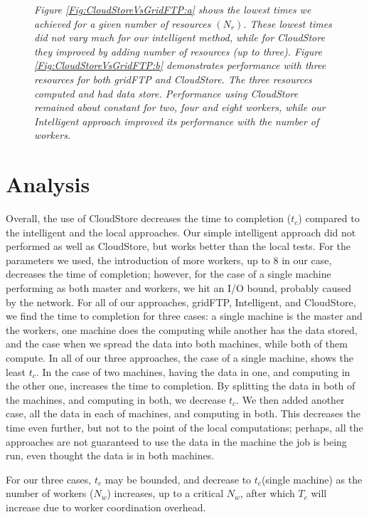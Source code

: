 \documentclass{rspublic}
\begin{document}
\begin{figure}
\begin{center}
{\label{Fig:CloudStoreVsGridFTP:b}
}
\caption{\textit{Figure \ref{Fig:CloudStoreVsGridFTP:a}
 shows the lowest times we achieved for a given number of resources
 $(N_{r})$. These lowest times did not vary much for our intelligent
 method, while for CloudStore they improved by adding number of
 resources (up to three). Figure \ref{Fig:CloudStoreVsGridFTP:b}
 demonstrates performance with three resources for both gridFTP and
 CloudStore. The three resources computed and had data store.
 Performance using CloudStore remained about constant for two, four and
 eight workers, while our Intelligent approach improved its performance
 with the number of workers.}}
\label{Fig:CloudStoreVsGridFTP}
\end{center}
\end{figure}

%

\section{Analysis}

Overall, the use of CloudStore decreases the time to completion
($t_c$) compared to the intelligent and the local approaches. Our
simple intelligent approach did not performed as well as CloudStore, but
works better than the local tests. For the parameters we used, the
introduction of more workers, up to 8 in our case, decreases the time of
completion; however, for the case of a single machine performing as both
master and workers, we hit an I/O bound, probably caused by the network.
For all of our approaches, gridFTP, Intelligent, and CloudStore, we find
the time to completion for three cases: a single machine is the master
and the workers, one machine does the computing while another has the
data stored, and the case when we spread the data into both machines,
while both of them compute. In all of our three approaches, the case of
a single machine, shows the least $t_c$. In the case of two machines,
having the data in one, and computing in the other one, increases the
time to completion. By splitting the data in both of the machines, and
computing in both, we decrease $t_c$. We then added another case, all
the data in each of machines, and computing in both. This decreases the
time even further, but not to the point of the local computations;
perhaps, all the approaches are not guaranteed to use the data in the
machine the job is being run, even thought the data is in both machines.

For our three cases, $t_c$ may be bounded, and decrease to $t_c$(single
machine) as the number of workers ($N_w$) increases, up to a critical
$N_w$, after which $T_c$ will increase due to worker coordination
overhead.
\end{document}
